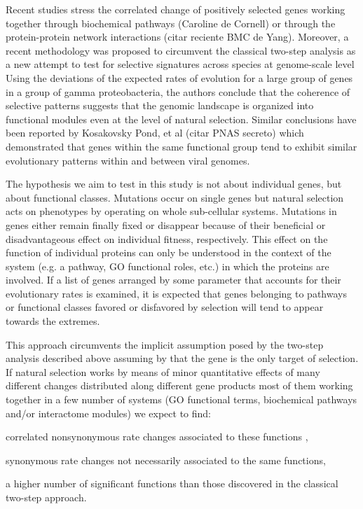 Recent studies stress the correlated change of positively selected genes working together through biochemical pathways (Caroline de Cornell) or through the protein-protein network interactions (citar reciente BMC de Yang). Moreover, a recent methodology was proposed to circumvent the classical two-step analysis as a new attempt to test for selective signatures across species at genome-scale level \cite{Shapiro2008} Using the deviations of the expected rates of evolution for a large group of genes in a group of gamma proteobacteria, the authors conclude that the coherence of selective patterns suggests that the genomic landscape is organized into functional modules even at the level of natural selection. Similar conclusions have been reported by Kosakovsky Pond, et al (citar PNAS secreto) which demonstrated that genes within the same functional group tend to exhibit similar evolutionary patterns within and between viral genomes.

The hypothesis we aim to test in this study is not about individual genes, but about functional classes. Mutations occur on single genes but natural selection acts on phenotypes by operating on whole sub-cellular systems. Mutations in genes either remain finally fixed or disappear because of their beneficial or disadvantageous effect on individual fitness, respectively. This effect on the function of individual proteins can only be understood in the context of the system (e.g. a pathway, GO functional roles, etc.) in which the proteins are involved. If a list of genes arranged by some parameter that accounts for their evolutionary rates is examined, it is expected that genes belonging to pathways or functional classes favored or disfavored by selection will tend to appear towards the extremes.

This approach circumvents the implicit assumption posed by the two-step analysis described above assuming by that the gene is the only target of selection. If natural selection works by means of minor quantitative effects of many different changes distributed along different gene products most of them working together in a few number of systems (GO functional terms, biochemical pathways and/or interactome modules) we expect to find: \begin{inparaenum}[ 1-] \item correlated nonsynonymous rate changes associated to these functions , \item synonymous rate changes not necessarily associated to the same functions, \item a higher number of significant functions than those discovered in the classical two-step approach.\end{inparaenum}

